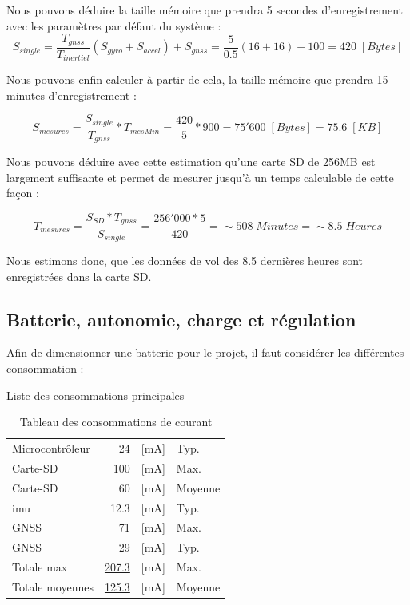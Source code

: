 Nous pouvons déduire la taille mémoire que prendra 5 secondes d'enregistrement avec les paramètres par défaut du système : 
\begin{equation*}
	S_{single} = \frac{T_{gnss}}{T_{inertiel}}(S_{gyro}+S_{accel}) + S_{gnss} = \frac{5}{0.5}(16+16) + 100 = 420 \; [Bytes]
\end{equation*}

Nous pouvons enfin calculer à partir de cela, la taille mémoire que prendra 15 minutes d'enregistrement : 

\begin{equation*}
	S_{mesures} = \frac{S_{single}}{T_{gnss}} * T_{mesMin} = \frac{420}{5} * 900 = 75'600 \; [Bytes] = 75.6 \; [KB]
\end{equation*}

Nous pouvons déduire avec cette estimation qu'une carte SD de 256MB est largement suffisante et permet de mesurer jusqu'à un temps calculable de cette façon :

\begin{equation*}
	T_{mesures} = \frac{S_{SD}*T_{gnss}}{S_{single}} = \frac{256'000*5}{420} = \sim508 \; Minutes = \sim8.5 \; Heures
\end{equation*}

Nous estimons donc, que les données de vol des 8.5 dernières heures sont enregistrées dans la carte SD.

\clearpage

\subsection{Batterie, autonomie, charge et régulation} 
Afin de dimensionner une batterie pour le projet, il faut considérer les différentes consommation :

\begin{center}
	\underline{Liste des consommations principales} \\
	\begin{table}[h]
		\centering
		\begin{tabular}{lrll}
			Microcontrôleur & 24 & [mA] & Typ. \\
			Carte-SD & ~100 & [mA] & Max. \\
			Carte-SD & ~60 & [mA] & Moyenne \\
			\gls{imu} & 12.3 & [mA] & Typ. \\
			\gls{GNSS} & 71 & [mA] & Max. \\
			\gls{GNSS} & 29 & [mA] & Typ. \\
			\hline
			Totale max & \underline{207.3} & [mA] & Max. \\
			Totale moyennes & \underline{125.3} & [mA] & Moyenne \\
			\hline
		\end{tabular}
		\caption{Tableau des consommations de courant}
		\label{tab:consommateur}
	\end{table}
\end{center}

